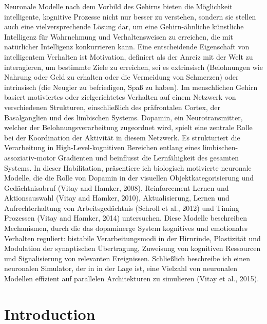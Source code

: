 \documentclass[
  11pt,
  a4paper,
]{scrbook}
\begin{document}
\newpage

Neuronale Modelle nach dem Vorbild des Gehirns bieten die Möglichkeit
intelligente, kognitive Prozesse nicht nur besser zu verstehen, sondern
sie stellen auch eine vielversprechende Lösung dar, um eine
Gehirn-ähnliche künstliche Intelligenz für Wahrnehmung und
Verhaltensweisen zu erreichen, die mit natürlicher Intelligenz
konkurrieren kann. Eine entscheidende Eigenschaft von intelligentem
Verhalten ist Motivation, definiert als der Anreiz mit der Welt zu
interagieren, um bestimmte Ziele zu erreichen, sei es extrinsisch
(Belohnungen wie Nahrung oder Geld zu erhalten oder die Vermeidung von
Schmerzen) oder intrinsisch (die Neugier zu befriedigen, Spaß zu haben).
Im menschlichen Gehirn basiert motiviertes oder zielgerichtetes
Verhalten auf einem Netzwerk von verschiedenen Strukturen,
einschließlich des präfrontalen Cortex, der Basalganglien und des
limbischen Systems. Dopamin, ein Neurotransmitter, welcher der
Belohnungsverarbeitung zugeordnet wird, spielt eine zentrale Rolle bei
der Koordination der Aktivität in diesem Netzwerk. Es strukturiert die
Verarbeitung in High-Level-kognitiven Bereichen entlang eines
limbischen-assoziativ-motor Gradienten und beinflusst die Lernfähigkeit
des gesamten Systems. In dieser Habilitation, präsentiere ich biologisch
motivierte neuronale Modelle, die die Rolle von Dopamin in der visuellen
Objektkategorisierung und Gedächtnisabruf (Vitay and Hamker, 2008),
Reinforcement Lernen und Aktionsauswahl (Vitay and Hamker, 2010),
Aktualisierung, Lernen und Aufrechterhaltung von Arbeitsgedächtnis
(Schroll et al., 2012) und Timing Prozessen (Vitay and Hamker, 2014)
untersuchen. Diese Modelle beschreiben Mechanismen, durch die das
dopaminerge System kognitives und emotionales Verhalten reguliert:
bistabile Verarbeitungsmodi in der Hirnrinde, Plastizität und Modulation
der synaptischen Übertragung, Zuweisung von kognitiven Ressourcen und
Signalisierung von relevanten Ereignissen. Schließlich beschreibe ich
einen neuronalen Simulator, der in in der Lage ist, eine Vielzahl von
neuronalen Modellen effizient auf parallelen Architekturen zu simulieren
(Vitay et al., 2015).


\chapter{Introduction}\label{sec:Introduction}
\end{document}
